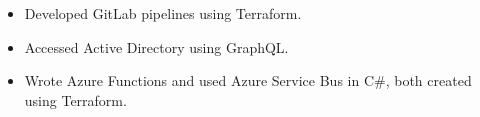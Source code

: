 \begin{itemize}
    \item Developed GitLab pipelines using Terraform.
    \item Accessed Active Directory using GraphQL.
    \item Wrote Azure Functions and used Azure Service Bus in C\#, both created using Terraform.
\end{itemize}
